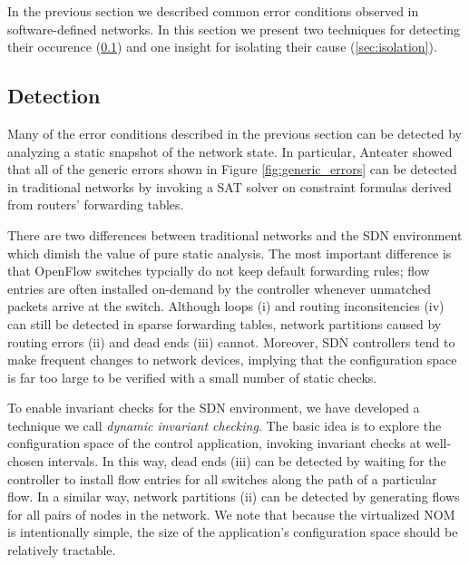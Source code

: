 
In the previous section we described common error conditions observed in
software-defined networks. In this section we present two techniques for
detecting their occurence (\ref{sec:detection}) and one insight for isolating their cause
(\ref{sec:isolation}).

\subsection{Detection}
\label{sec:detection}

Many of the error conditions described in the previous section can be detected
by analyzing a static snapshot of the network state. In particular, Anteater \cite{anteater}
showed that all of the generic errors shown in Figure
\ref{fig:generic_errors} can be detected in traditional networks by invoking a
SAT solver on constraint formulas derived from routers' forwarding tables.

There are two differences between traditional networks and the SDN environment
which dimish the value of pure static analysis. The most important
difference is that OpenFlow switches typcially do not keep default forwarding
rules; flow entries are often installed on-demand by the controller
whenever unmatched packets arrive at the switch. Although loops (i) and
routing inconsitencies (iv) can still be detected in sparse forwarding tables,
network partitions caused by routing errors (ii)
and dead ends (iii) cannot. Moreover, SDN controllers tend to make frequent
changes to network devices, implying that the configuration space is far too
large to be verified with a small number of static checks.

To enable invariant checks for the SDN environment, we have developed a
technique we call {\it dynamic invariant checking}. The basic idea is to
explore the configuration space of the control application, invoking
invariant checks at well-chosen intervals. In this way, dead ends (iii) can be
detected by waiting for the controller to install flow entries for all
switches along the path of a particular flow. In a similar way, network
partitions (ii) can be detected by generating flows for all pairs of nodes in
the network. We note that because the virtualized NOM is intentionally simple,
the size of the application's configuration space should be relatively
tractable.



